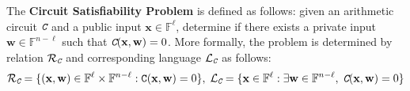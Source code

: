 \documentclass[../lecture-notes.tex]{subfiles}
\begin{document}
\begin{definition}
    The \textbf{Circuit Satisfiability Problem} is defined as follows: given an arithmetic circuit $\textit{\texttt{C}}$ and a public input $\mathbf{x} \in \mathbb{F}^{\ell}$, determine if there exists a private input $\mathbf{w} \in \mathbb{F}^{n-\ell}$ such that $\textit{\texttt{C}}(\mathbf{x},\mathbf{w}) = 0$. More formally, the problem is determined by relation $\mathcal{R}_{\textit{\texttt{C}}}$ and corresponding language $\mathcal{L}_{\textit{\texttt{C}}}$ as follows:
    \begin{equation*}
        \mathcal{R}_{\textit{\texttt{C}}} = \{(\mathbf{x},\mathbf{w}) \in \mathbb{F}^{\ell} \times \mathbb{F}^{n-\ell}: \mathtt{C}(\mathbf{x},\mathbf{w}) = 0\}, \; \mathcal{L}_{\textit{\texttt{C}}} = \{\mathbf{x} \in \mathbb{F}^{\ell}: \exists \mathbf{w} \in \mathbb{F}^{n-\ell},\; \textit{\texttt{C}}(\mathbf{x},\mathbf{w}) = 0\}
    \end{equation*}
\end{definition}
\end{document}
